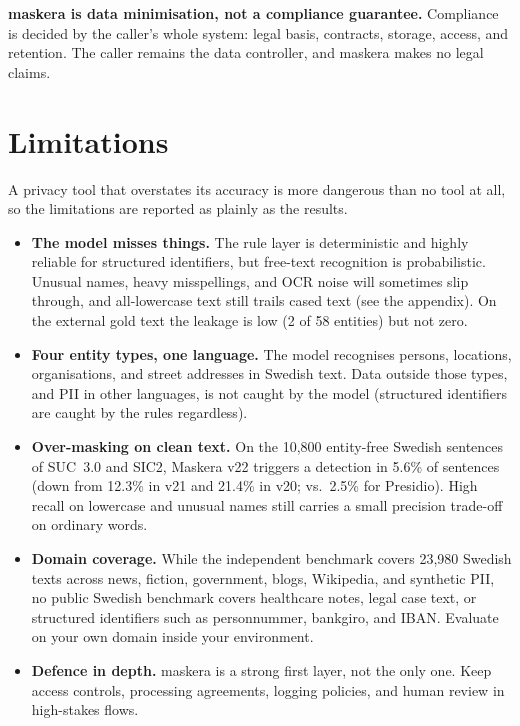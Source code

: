 \documentclass[10pt,a4paper]{article}
\begin{document}
\textbf{maskera is data minimisation, not a compliance guarantee.} Compliance
is decided by the caller's whole system: legal basis, contracts, storage,
access, and retention. The caller remains the data controller, and maskera
makes no legal claims.

\section{Limitations}

A privacy tool that overstates its accuracy is more dangerous than no tool at
all, so the limitations are reported as plainly as the results.

\begin{itemize}
  \item \textbf{The model misses things.} The rule layer is deterministic and
        highly reliable for structured identifiers, but free-text recognition
        is probabilistic. Unusual names, heavy misspellings, and OCR noise
        will sometimes slip through, and all-lowercase text still trails
        cased text (see the appendix). On the external gold text the leakage is
        low (2 of 58 entities) but not zero.
  \item \textbf{Four entity types, one language.} The model recognises
        persons, locations, organisations, and street addresses in Swedish
        text. Data outside those types, and PII in other languages, is not
        caught by the model (structured identifiers are caught by the rules
        regardless).
  \item \textbf{Over-masking on clean text.} On the 10,800 entity-free Swedish
        sentences of SUC~3.0 and SIC2, Maskera v22 triggers a detection in
        5.6\% of sentences (down from 12.3\% in v21 and 21.4\% in v20; vs.\
        2.5\% for Presidio). High recall on lowercase and unusual names still
        carries a small precision trade-off on ordinary words.
  \item \textbf{Domain coverage.} While the independent benchmark covers
        23,980 Swedish texts across news, fiction, government, blogs, Wikipedia,
        and synthetic PII, no public Swedish benchmark covers healthcare notes,
        legal case text, or structured identifiers such as personnummer,
        bankgiro, and IBAN. Evaluate on your own domain inside your environment.
  \item \textbf{Defence in depth.} maskera is a strong first layer, not the
        only one. Keep access controls, processing agreements, logging
        policies, and human review in high-stakes flows.
\end{itemize}
\end{document}
